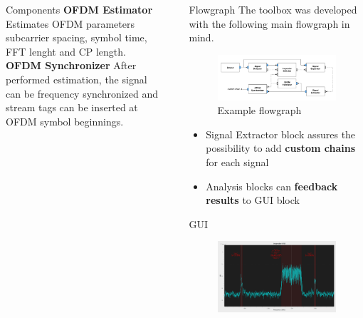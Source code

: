 \documentclass{beamer}
\begin{document}
\begin{frame}
\begin{columns}[t]
\begin{column}{0.33\textwidth}
\begin{block}{Components}
\textbf{OFDM Estimator}
Estimates OFDM parameters subcarrier spacing, symbol time, FFT lenght and CP length.\\[0.5em]

\textbf{OFDM Synchronizer}
After performed estimation, the signal can be frequency synchronized and stream tags can be inserted at OFDM symbol beginnings.
\vspace{1.5em}
      \end{block}
    \end{column}
    \begin{column}{0.01\textwidth}
    \end{column}
    \begin{column}{0.66\textwidth}
      \begin{block}{Flowgraph}
        The toolbox was developed with the following main flowgraph in mind.
        \begin{figure}
          \includegraphics[width=\textwidth]{figures/flowgraph}
          \caption{Example flowgraph}
        \end{figure}
        \begin{itemize}
          \item Signal Extractor block assures the possibility to add \textbf{custom chains} for each signal 
          \item Analysis blocks can \textbf{feedback results} to GUI block
        \end{itemize}
      \end{block}
      \begin{block}{GUI}
      \begin{figure}
      	\includegraphics[width=\textwidth]{figures/gui.png}

\end{figure}
\end{block}
\end{column}
\end{columns}
\end{frame}
\end{document}
